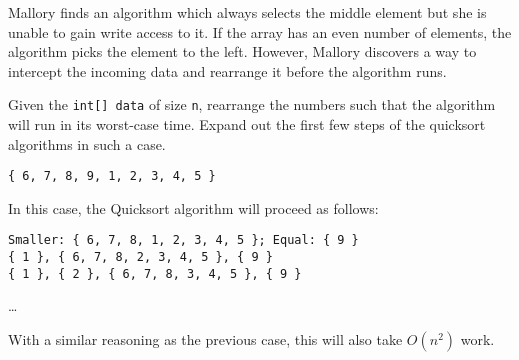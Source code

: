 \begin{blocksection}
\question Mallory finds an algorithm which always selects the middle element
but she is unable to gain write access to it. If the array has an even number
of elements, the algorithm picks the element to the left. However, Mallory discovers
a way to intercept the incoming data and rearrange it before the algorithm runs.

Given the \lstinline$int[] data$ of size \lstinline$n$, rearrange the numbers such 
that the algorithm will run in its worst-case time. Expand out the first few steps
of the quicksort algorithms in such a case.

\begin{solution}[1in]
\begin{verbatim}
{ 6, 7, 8, 9, 1, 2, 3, 4, 5 }
\end{verbatim}

In this case, the Quicksort algorithm will proceed as follows:

\begin{verbatim}
Smaller: { 6, 7, 8, 1, 2, 3, 4, 5 }; Equal: { 9 }
{ 1 }, { 6, 7, 8, 2, 3, 4, 5 }, { 9 }
{ 1 }, { 2 }, { 6, 7, 8, 3, 4, 5 }, { 9 }
\end{verbatim}
\ldots

With a similar reasoning as the previous case, this will also take 
$O(n^2)$ work.

\end{solution}
\end{blocksection}

